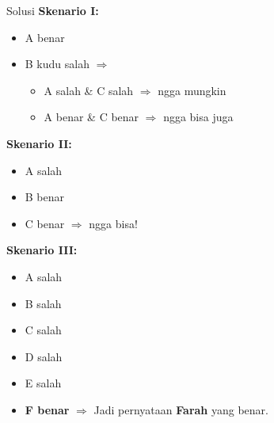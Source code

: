 \documentclass[english,t]{beamer}
\begin{document}
\begin{frame}{Solusi}
\textbf{Skenario I:}\\
\begin{itemize}
	\item A benar
	\item B kudu salah $\Rightarrow$
	\begin{itemize}
		\item A salah \& C salah $\Rightarrow$ ngga mungkin 
		\item A benar \& C benar $\Rightarrow$ ngga bisa juga 
	\end{itemize}
\end{itemize}

\textbf{Skenario II:}\\
\begin{itemize}
	\item A salah
	\item B benar
	\item C benar $\Rightarrow$ ngga bisa!
\end{itemize}

\textbf{Skenario III:}\\
\begin{itemize}
	\item A salah
	\item B salah
	\item C salah
	\item D salah
	\item E salah
	\item \textbf{F benar} $\Rightarrow$ Jadi pernyataan \textbf{Farah} yang benar.
\end{itemize}
\end{frame}
\end{document}

